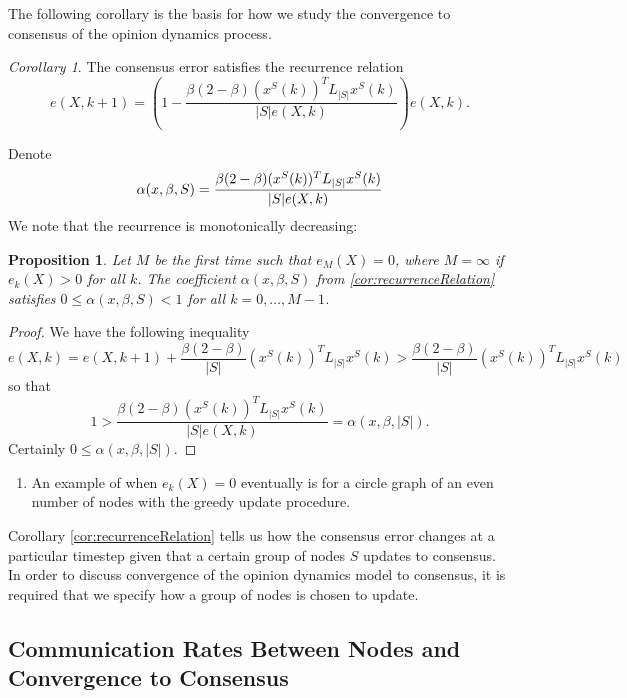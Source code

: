\documentclass{amsart}
\newtheorem{proposition}{Proposition}
\theoremstyle{remark}
\newtheorem{corollary}{Corollary}
\begin{document}
The following corollary is the basis for how we study the convergence to consensus of the opinion dynamics process. 
\begin{corollary}{\label{cor:recurrenceRelation}}
	The consensus error satisfies the recurrence relation
	\begin{equation}\label{eq:discordanceRecurrence}
		e(X,k+1) = \left(1-\frac{\beta(2-\beta)(x^S(k))^TL_{|S|}x^S(k)}{|S|e(X,k)}\right)e(X,k).
	\end{equation}
\end{corollary}
Denote 
\begin{equation}{\label{eq:coefficientNotation}}
	\alpha(x,\beta,S) = \frac{\beta(2-\beta)(x^S(k))^TL_{|S|}x^S(k)}{|S|e(X,k)}
\end{equation}
We note that the recurrence is monotonically decreasing:
\begin{proposition}{\label{prop:monotoneDecreaseRecurrence}}
	Let $M$ be the first time such that $e_M(X)=0$, where $M=\infty$ if $e_k(X)>0$ for all $k$. The coefficient $\alpha(x,\beta,S)$ from \eqref{cor:recurrenceRelation} satisfies $0\leq \alpha(x,\beta,S) < 1$ for all $k=0,\ldots,M-1$.
\end{proposition}
\begin{proof}
	We have the following inequality
	\begin{equation}
		e(X,k) = e(X,k+1) + \frac{\beta(2-\beta)}{|S|}(x^S(k))^TL_{|S|}x^S(k) >  \frac{\beta(2-\beta)}{|S|}(x^S(k))^TL_{|S|}x^S(k)
	\end{equation}
	so that
	\begin{equation}
		1 > \frac{\beta(2-\beta)(x^S(k))^TL_{|S|}x^S(k)}{|S|e(X,k)} = \alpha(x,\beta,|S|).
	\end{equation}
	Certainly $0\leq \alpha(x,\beta,|S|)$.
\end{proof}
\begin{enumerate}
	\item An example of when $e_k(X) = 0$ eventually is for a circle graph of an even number of nodes with the greedy update procedure.
\end{enumerate}

Corollary \ref{cor:recurrenceRelation} tells us how the consensus error changes at a particular timestep given that a certain group of nodes $S$ updates to consensus. In order to discuss convergence of the opinion dynamics model to consensus, it is required that we specify how a group of nodes is chosen to update. 

\subsection{Communication Rates Between Nodes and Convergence to Consensus}
\end{document}
